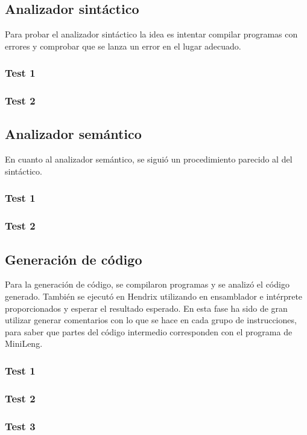 \subsection{Analizador sintáctico}
Para probar el analizador sintáctico la idea es intentar compilar programas con errores y comprobar que se lanza un error en el lugar adecuado.

\subsubsection{Test 1}

\subsubsection{Test 2}

\subsection{Analizador semántico}
En cuanto al analizador semántico, se siguió un procedimiento parecido al del sintáctico.

\subsubsection{Test 1}

\subsubsection{Test 2}

\subsection{Generación de código}
Para la generación de código, se compilaron programas y se analizó el código generado. También se ejecutó en Hendrix utilizando en ensamblador e intérprete proporcionados y esperar el resultado esperado. En esta fase ha sido de gran utilizar generar comentarios con lo que se hace en cada grupo de instrucciones, para saber que partes del código intermedio corresponden con el programa de MiniLeng.

\subsubsection{Test 1}

\subsubsection{Test 2}

\subsubsection{Test 3}
